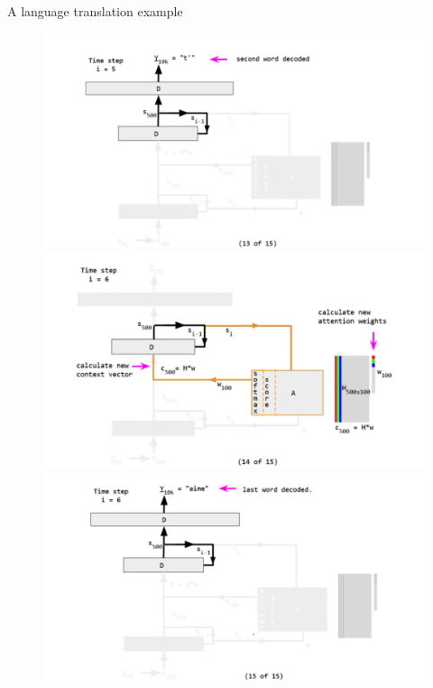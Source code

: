 \documentclass[
  notheorems,
  aspectratio=54,
]{beamer}
\begin{document}
\begin{frame}{A language translation example}
\begin{figure}
  \begin{minipage}[b]{0.4\textwidth}
    \par\medskip
    \includegraphics[width=1.3\textwidth]{./translation/13.png}
  \end{minipage}
  \hfill
  \begin{minipage}[b]{0.4\textwidth}
    \par\medskip
    \includegraphics[width=1.3\textwidth]{./translation/14.jpg}
  \end{minipage}
  \begin{minipage}[b]{0.4\textwidth}
    \par\medskip
    \includegraphics[width=1.3\textwidth]{./translation/15.png}
  \end{minipage}
\end{figure}
\end{frame}
\end{document}
